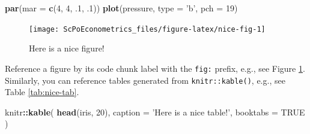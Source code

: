 \documentclass[]{book}
\newenvironment{Shaded}{\begin{snugshade}}{\end{snugshade}}
\newcommand{\KeywordTok}[1]{\textcolor[rgb]{0.13,0.29,0.53}{\textbf{#1}}}
\newcommand{\DataTypeTok}[1]{\textcolor[rgb]{0.13,0.29,0.53}{#1}}
\newcommand{\DecValTok}[1]{\textcolor[rgb]{0.00,0.00,0.81}{#1}}
\newcommand{\StringTok}[1]{\textcolor[rgb]{0.31,0.60,0.02}{#1}}
\newcommand{\OtherTok}[1]{\textcolor[rgb]{0.56,0.35,0.01}{#1}}
\newcommand{\OperatorTok}[1]{\textcolor[rgb]{0.81,0.36,0.00}{\textbf{#1}}}
\newcommand{\NormalTok}[1]{#1}
\theoremstyle{definition}
\theoremstyle{definition}
\theoremstyle{definition}
\theoremstyle{remark}
\begin{document}
\begin{Shaded}
\begin{Highlighting}[]
\KeywordTok{par}\NormalTok{(}\DataTypeTok{mar =} \KeywordTok{c}\NormalTok{(}\DecValTok{4}\NormalTok{, }\DecValTok{4}\NormalTok{, .}\DecValTok{1}\NormalTok{, .}\DecValTok{1}\NormalTok{))}
\KeywordTok{plot}\NormalTok{(pressure, }\DataTypeTok{type =} \StringTok{'b'}\NormalTok{, }\DataTypeTok{pch =} \DecValTok{19}\NormalTok{)}
\end{Highlighting}
\end{Shaded}

\begin{figure}

{\centering \texttt{[image: ScPoEconometrics\_files/figure-latex/nice-fig-1]} 

}

\caption{Here is a nice figure!}\label{fig:nice-fig}
\end{figure}

Reference a figure by its code chunk label with the \texttt{fig:}
prefix, e.g., see Figure \ref{fig:nice-fig}. Similarly, you can
reference tables generated from \texttt{knitr::kable()}, e.g., see Table
\ref{tab:nice-tab}.

\begin{Shaded}
\begin{Highlighting}[]
\NormalTok{knitr}\OperatorTok{::}\KeywordTok{kable}\NormalTok{(}
  \KeywordTok{head}\NormalTok{(iris, }\DecValTok{20}\NormalTok{), }\DataTypeTok{caption =} \StringTok{'Here is a nice table!'}\NormalTok{,}
  \DataTypeTok{booktabs =} \OtherTok{TRUE}
\NormalTok{)}
\end{Highlighting}
\end{Shaded}
\end{document}

